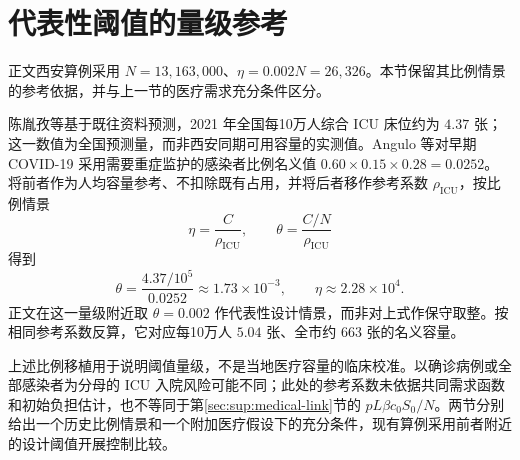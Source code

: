 \section{代表性阈值的量级参考}
\label{sec:sup:threshold-scale}
正文西安算例采用 $N=13{,}163{,}000$\cite{XianStat2021}、$\eta=0.002N=26{,}326$。本节保留其比例情景的参考依据，并与上一节的医疗需求充分条件区分。

陈胤孜等\cite{Chen2021ICUForecast}基于既往资料预测，2021 年全国每10万人综合 ICU 床位约为 $4.37$ 张；这一数值为全国预测量，而非西安同期可用容量的实测值。Angulo 等\cite[补充材料 S4.1]{Angulo2021}对早期 COVID-19 采用需要重症监护的感染者比例名义值 $0.60\times0.15\times0.28=0.0252$。将前者作为人均容量参考、不扣除既有占用，并将后者移作参考系数 $\rho_{\mathrm{ICU}}$，按比例情景
\[
\eta=\frac{C}{\rho_{\mathrm{ICU}}},\qquad
\theta=\frac{C/N}{\rho_{\mathrm{ICU}}}
\]
得到
\[
\theta=\frac{4.37/10^5}{0.0252}\approx1.73\times10^{-3},
\qquad \eta\approx2.28\times10^4.
\]
正文在这一量级附近取 $\theta=0.002$ 作代表性设计情景，而非对上式作保守取整。按相同参考系数反算，它对应每10万人 $5.04$ 张、全市约 $663$ 张的名义容量。

上述比例移植用于说明阈值量级，不是当地医疗容量的临床校准。以确诊病例或全部感染者为分母的 ICU 入院风险可能不同\cite{Pung2023Undetected}；此处的参考系数未依据共同需求函数和初始负担估计，也不等同于第\ref{sec:sup:medical-link}节的 $pL\beta c_0S_0/N$。两节分别给出一个历史比例情景和一个附加医疗假设下的充分条件，现有算例采用前者附近的设计阈值开展控制比较。

